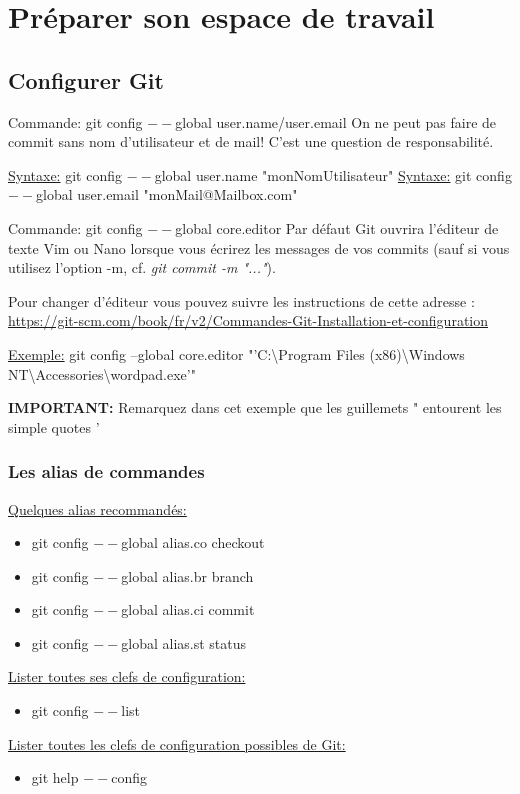 \documentclass{beamer}
\begin{document}
\section{Préparer son espace de travail}

\subsection{Configurer Git}
\begin{frame}{Commande: git config $--$global user.name/user.email}
On ne peut pas faire de commit sans nom d'utilisateur et de mail! C'est une question de responsabilité.
\medskip

\underline{Syntaxe:} git config $--$global user.name "monNomUtilisateur"
\smallskip
\underline{Syntaxe:} git config $--$global user.email "monMail@Mailbox.com"
\medskip
\end{frame}

\begin{frame}{Commande: git config $--$global core.editor}
Par défaut Git ouvrira l'éditeur de texte Vim ou Nano lorsque vous écrirez les messages de vos commits (sauf si vous utilisez l'option -m, cf. \textit{git commit -m "..."}).\\
\medskip

Pour changer d'éditeur vous pouvez suivre les instructions de cette adresse : \url{https://git-scm.com/book/fr/v2/Commandes-Git-Installation-et-configuration}\\
\medskip

\underline{Exemple:} git config --global core.editor "'C:\textbackslash Program Files (x86)\textbackslash Windows NT\textbackslash Accessories\textbackslash wordpad.exe'"\\
\medskip

\textbf{IMPORTANT:} Remarquez dans cet exemple que les guillemets " entourent les simple quotes ' 
\end{frame}

\begin{frame}
\frametitle{Les alias de commandes}

\underline{Quelques alias recommandés:}
\begin{itemize} 
    \item[] git config $--$global alias.co checkout
    \item[] git config $--$global alias.br branch
    \item[] git config $--$global alias.ci commit
    \item[] git config $--$global alias.st status
\end{itemize}
\medskip

\underline{Lister toutes ses clefs de configuration:}
\begin{itemize}
    \item[] git config $--$list
\end{itemize}
\medskip

\underline{Lister toutes les clefs de configuration possibles de Git:}
\begin{itemize}
    \item[] git help $--$config
\end{itemize}
\end{frame}
\end{document}
